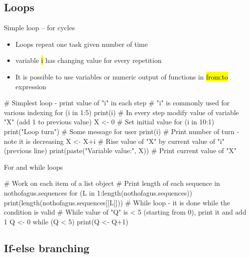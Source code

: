 \documentclass[compress, ucs, xelatex, 11pt, xcolor=svgnames,
  hyperref={
    bookmarks=true,
    unicode=true,
    colorlinks=true,
    pdftitle={Molecular data in R},
    plainpages=false,
    pdfauthor={Vojtech Zeisek},
    pdfsubject={Course about phylogeny and evolution in R},
    pdfcreator={XeLaTeX},
    pdfkeywords={R, evolution, phylogeny, molecular data},
    linkcolor=Tomato,
    anchorcolor=SaddleBrown,
    citecolor=Goldenrod,
    filecolor=DarkMagenta,
    menucolor=Sienna,
    urlcolor=DarkTurquoise,
    pdftex},
  url={hyphens, lowtilde} %
  ]{beamer}
\renewcommand{\texttt}[1]{\hl{\ttfamily #1}}
\begin{document}
\subsection{Loops}

\begin{frame}[fragile]{Simple loop -- for cycles}
  \begin{itemize}
    \item Loops repeat one task given number of time
    \item variable \texttt{i} has changing value for every repetition
    \item It is possible to use variables or numeric output of functions in \texttt{from:to} expression
  \end{itemize}
  \begin{spluscode}
    # Simplest loop - print value of "i" in each step
    # "i" is commonly used for various indexing
    for (i in 1:5) { print(i) }
    # In every step modify value of variable "X" (add 1 to previous value)
    X <- 0 # Set initial value
    for (i in 10:1) {
      print("Loop turn") # Some message for user
      print(i) # Print number of turn - note it is decreasing
      X <- X+i # Rise value of "X" by current value of "i" (previous line)
      print(paste("Variable value:", X)) # Print current value of "X"
      }
  \end{spluscode}
\end{frame}

\begin{frame}[fragile]{For and while loops} %
  \begin{spluscode}
    # Work on each item of a list object
    # Print length of each sequence in nothofagus.sequences
    for (L in 1:length(nothofagus.sequences)) {
      print(length(nothofagus.sequences[[L]])) }
    # While loop - it is done while the condition is valid
    # While value of "Q" is < 5 (starting from 0), print it and add 1
    Q <- 0
    while (Q < 5) { print(Q <- Q+1) }
  \end{spluscode}
\end{frame}

\subsection{If-else branching}
\end{document}
